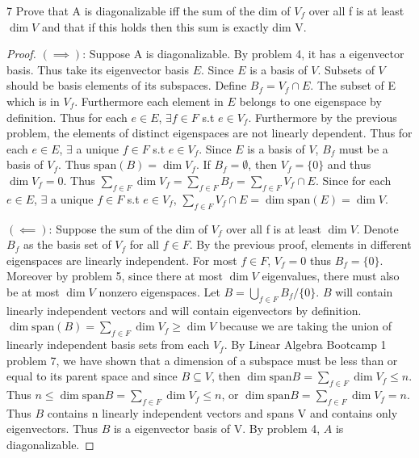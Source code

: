 \documentclass{article}
\begin{document}
\bigskip

\begin{PROB}{7}\label{Problem 7.}
    Prove that A is diagonalizable iff the sum of the dim of $V_f$ over all f is at least $\dim V$  and that if this holds then this sum is exactly dim V. 
\end{PROB}
\begin{proof}
    $(\implies)$: Suppose A is diagonalizable. By problem 4, it has a eigenvector basis. Thus take its eigenvector basis $E$. Since $E$ is a basis of $V$. Subsets of $V$ should be basis elements of its subspaces. Define $B_f = V_f \cap E$. The subset of E which is in $V_f$. Furthermore each element in $E$ belongs to one eigenspace by definition. Thus for each $e \in E$, $\exists f \in F$ s.t $e \in V_f$. Furthermore by the previous problem, the elements of distinct eigenspaces are not linearly dependent. Thus for each $e \in E$, $\exists$ a unique $f \in F$ s.t $e \in V_f$. Since $E$ is a basis of $V$, $B_f$ must be a basis of $V_f$. Thus $\mathrm{span}(B) = \dim V_f$. If $B_f = \emptyset$, then $V_f = \{0\}$ and thus $\dim V_f = 0$. Thus $\sum_{f \in F} \dim V_f = \sum_{f \in F}B_f = \sum_{f \in F} V_f \cap E$. Since for each $e \in E$, $\exists$ a unique $f \in F$ s.t $e \in V_f$, $\sum_{f \in F} V_f \cap E = \dim \mathrm{span}(E) = \dim V$.

    $(\impliedby)$: Suppose the sum of the dim of $V_f$ over all f is at least $\dim V$. Denote $B_{f}$ as the basis set of $V_f$ for all $f \in F$. By the previous proof, elements in different eigenspaces are linearly independent. For most $f \in F$, $V_{f} = {0}$ thus $B_f = \{0\}$. Moreover by problem 5, since there at most $\dim V$ eigenvalues, there must also be at most $\dim V$ nonzero eigenspaces. Let $B = \bigcup_{f \in F}B_f/\{0\}$. $B$ will contain linearly independent vectors and will contain eigenvectors by definition. $\dim \mathrm{span}(B) = \sum_{f\in F}\dim V_f \geq \dim V$ because we are taking the union of linearly independent basis sets from each $V_f$. By Linear Algebra Bootcamp 1 problem 7, we have shown that a dimension of a subspace must be less than or equal to its parent space and since $B \subseteq V$, then $\dim \mathrm{span} B = \sum_{f\in F}\dim V_f \leq n $. Thus $n \leq \dim \mathrm{span} B = \sum_{f\in F}\dim V_f \leq n$, or $\dim \mathrm{span} B = \sum_{f\in F}\dim V_f = n$. Thus $B$ contains n linearly independent vectors and spans V and contains only eigenvectors. Thus $B$ is a eigenvector basis of V. By problem 4, $A$ is diagonalizable.
\end{proof}
\end{document}
